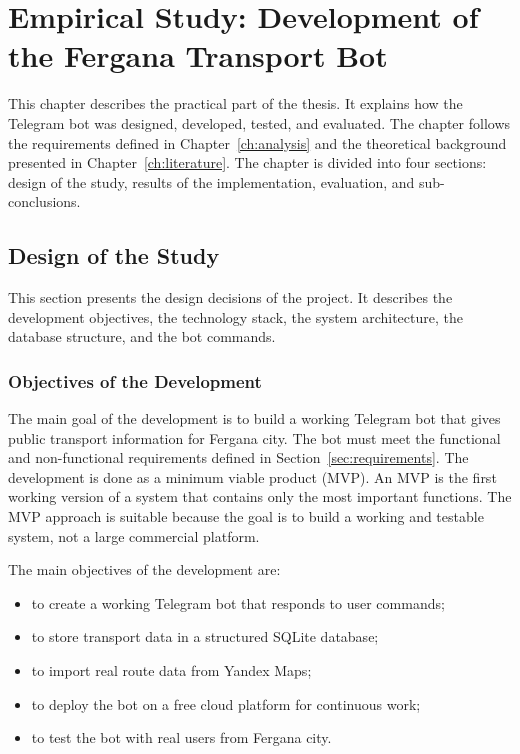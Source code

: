 \chapter{Empirical Study: Development of the Fergana Transport Bot}
\label{ch:development}

This chapter describes the practical part of the thesis. It explains how the
Telegram bot was designed, developed, tested, and evaluated. The chapter
follows the requirements defined in Chapter~\ref{ch:analysis} and the
theoretical background presented in Chapter~\ref{ch:literature}. The chapter
is divided into four sections: design of the study, results of the
implementation, evaluation, and sub-conclusions.

\section{Design of the Study}
\label{sec:design}

This section presents the design decisions of the project. It describes the
development objectives, the technology stack, the system architecture, the
database structure, and the bot commands.

\subsection{Objectives of the Development}
\label{subsec:objectives}

The main goal of the development is to build a working Telegram bot that
gives public transport information for Fergana city. The bot must meet the
functional and non-functional requirements defined in
Section~\ref{sec:requirements}. The development is done as a minimum viable
product (MVP). An MVP is the first working version of a system that contains
only the most important functions. The MVP approach is suitable because the
goal is to build a working and testable system, not a large commercial
platform.

The main objectives of the development are:
\begin{itemize}
    \item to create a working Telegram bot that responds to user commands;
    \item to store transport data in a structured SQLite database;
    \item to import real route data from Yandex Maps;
    \item to deploy the bot on a free cloud platform for continuous work;
    \item to test the bot with real users from Fergana city.
\end{itemize}

